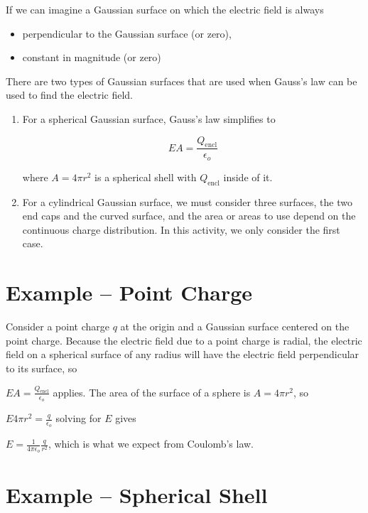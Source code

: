 \documentclass{article}
\newcommand{\ds}[0]{\displaystyle}
\begin{document}
If we can imagine a Gaussian surface on which the electric field is always

\begin{itemize}

  \item perpendicular to the Gaussian surface (or zero),

  \item constant in magnitude (or zero)

\end{itemize}

There are two types of Gaussian surfaces that are used when Gauss's law can be used to find the electric field.

\begin{enumerate}

  \item For a spherical Gaussian surface, Gauss's law simplifies to

        $$EA = \frac{Q_{\text{encl}}}{\epsilon_o}$$

        where $A=4\pi r^2$ is a spherical shell with $Q_{\text{encl}}$ inside of it.

  \item For a cylindrical Gaussian surface, we must consider three surfaces, the two end caps and the curved surface, and the area or areas to use depend on the continuous charge distribution. In this activity, we only consider the first case.

\end{enumerate}

\section{Example -- Point Charge}

Consider a point charge $q$ at the origin and a Gaussian surface centered on the point charge. Because the electric field due to a point charge is radial, the electric field on a spherical surface of any radius will have the electric field perpendicular to its surface, so

$\ds EA = \frac{Q_{\text{encl}}}{\epsilon_o}$ applies. The area of the surface of a sphere is $A = 4\pi r^2$, so

$\ds E 4\pi r^2 = \frac{q}{\epsilon_o}$ solving for $E$ gives

$\ds E = \frac{1}{4\pi\epsilon_o}\frac{q}{r^2}$, which is what we expect from Coulomb's law.

\section{Example -- Spherical Shell}
\end{document}
